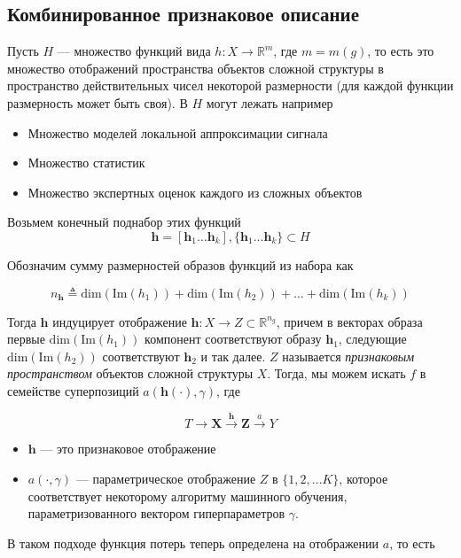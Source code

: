 \documentclass[12pt, fleqn, unicode]{article}
\newcommand{\bX}{\mathbf{X}}
\newcommand{\bh}{\mathbf{h}}
\newcommand{\bZ}{\mathbf{Z}}
\newcommand{\R}{\mathbb{R}}
\begin{document}
\subsection{Комбинированное признаковое описание}

Пусть $H$ --- множество функций вида
$h: X \to \R^m$, где $m = m(g)$, то есть это множество отображений
пространства объектов сложной структуры в пространство действительных чисел
некоторой размерности (для каждой функции размерность может быть своя). В
$H$ могут лежать например

\begin{itemize}
    \item Множество моделей локальной аппроксимации сигнала
    \item Множество статистик
    \item Множество экспертных оценок каждого из сложных объектов
\end{itemize}

Возьмем конечный поднабор этих функций
$$
\bh = [\bh_1\ldots \bh_k], \{\bh_1\ldots \bh_k\} \subset H
$$

Обозначим сумму размерностей образов функций из набора как

$$
n_\bh \triangleq \mathrm{dim}(\mathrm{Im}(h_1)) +
\mathrm{dim}(\mathrm{Im}(h_2)) + \ldots +
\mathrm{dim}(\mathrm{Im}(h_k))
$$

Тогда $\bh$ индуцирует отображение $\bh: X \to Z \subset \R^{n_g}$,
причем в векторах образа первые $\mathrm{dim}(\mathrm{Im}(h_1))$ компонент соответствуют
образу $\bh_1$, следующие $\mathrm{dim}(\mathrm{Im}(h_2))$ соответствуют $\bh_2$
и так далее. $Z$ называется \textit{признаковым пространством}
объектов сложной структуры $X$. Тогда, мы можем искать $f$ в семействе
суперпозиций $a(\bh(\cdot), \gamma)$, где

$$
T \rightarrow \bX \xrightarrow{\bh} \bZ \xrightarrow{a} Y
$$

\begin{itemize}
    \item $\bh$ --- это признаковое отображение
    \item $a(\cdot, \gamma)$ --- параметрическое отображение $Z$ в $\{1, 2, \ldots K\}$,
    которое соответствует некоторому алгоритму машинного обучения,
    параметризованного вектором гиперпараметров $\gamma$.
\end{itemize}

В таком подходе функция потерь теперь определена
на отображении $a$, то есть
\end{document}
